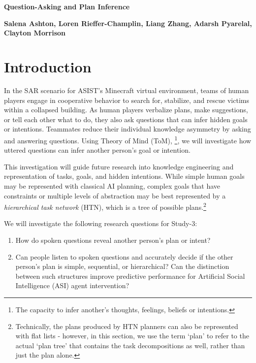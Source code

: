 \documentclass[10pt]{article}
\begin{document}



\textbf{Question-Asking and Plan Inference}


\textbf{Salena Ashton, Loren Rieffer-Champlin, Liang Zhang,
Adarsh Pyarelal, Clayton Morrison}

\section{Introduction}

In the SAR scenario for ASIST's Minecraft virtual environment, teams of human players engage in cooperative behavior to search for, stabilize, and rescue victims within a collapsed building. As human players verbalize plans, make suggestions, or tell each other what to do, they also ask questions that can infer hidden goals or intentions. Teammates reduce their individual knowledge asymmetry by asking and answering questions. Using Theory of Mind (ToM), \footnote{The capacity to infer another's thoughts, feelings, beliefs or intentions.}, we will investigate how uttered questions can infer another person's goal or intention. 

This investigation will guide future research into knowledge engineering and representation of tasks, goals, and hidden intentions. While simple human goals may be represented with classical AI planning, complex goals that have constraints or multiple levels of abstraction may be best represented by a \emph{hierarchical task network} (HTN), which is a tree of possible plans.\footnote{Technically, the plans
    produced by HTN planners can also be represented with flat lists - however,
in this section, we use the term `plan' to refer to the actual `plan tree' that
contains the task decompositions as well, rather than just the plan alone.}




We will investigate the following research questions for Study-3:

\begin{enumerate}
    \item How do spoken questions reveal another person’s plan or intent? 
    \item Can people listen to spoken questions and accurately decide if the other person's plan
        is simple, sequential, or hierarchical? Can the distinction between such
        structures improve predictive performance for Artificial Social
        Intelligence (ASI) agent intervention?
\end{enumerate}
\end{document}
